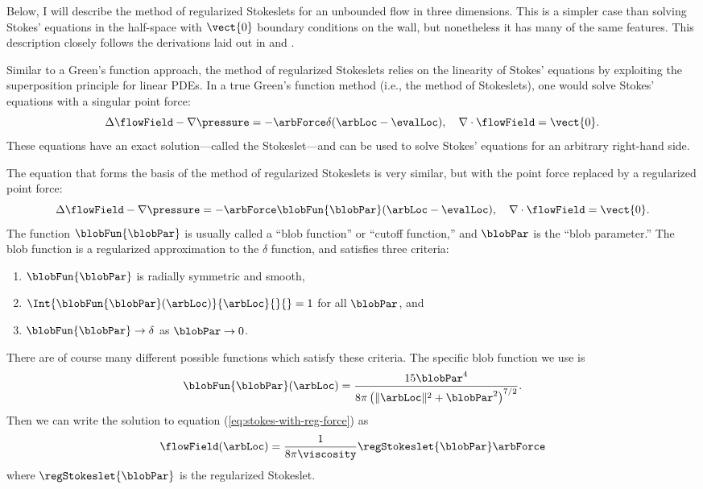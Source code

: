 Below, I will describe the method of regularized Stokeslets for an
unbounded flow in three dimensions. This is a simpler case than
solving Stokes' equations in the half-space with $\vect{0}$
boundary conditions on the wall, but nonetheless it has many of the
same features. This description closely follows the derivations laid
out in \cite{Cortez2001} and \cite{Cortez2005}. %

Similar to a Green's function approach, the method of regularized
Stokeslets relies on the linearity of Stokes' equations by exploiting
the superposition principle for linear PDEs. In a true Green's
function method (i.e., the method of Stokeslets), one would solve
Stokes' equations with a singular point force:
\begin{equation}
  \label{eq:stokes-with-pt-force}
  \Delta \flowField - \nabla \pressure = -\arbForce \delta(\arbLoc
  - \evalLoc), \quad \nabla \cdot \flowField = \vect{0}.
\end{equation}
These equations have an exact solution---called the Stokeslet---and
can be used to solve Stokes' equations for an arbitrary right-hand
side.

The equation that forms the basis of the method of regularized
Stokeslets is very similar, but with the point force replaced by a
regularized point force:
\begin{equation}
  \label{eq:stokes-with-reg-force}
  \Delta \flowField - \nabla \pressure = -\arbForce
  \blobFun{\blobPar}(\arbLoc - \evalLoc), \quad \nabla \cdot
  \flowField = \vect{0}.
\end{equation}
The function $\blobFun{\blobPar}$ is usually called a ``blob
function'' or ``cutoff function,'' and $\blobPar$ is the ``blob
parameter.'' The blob function is a regularized approximation to the
$\delta$ function, and satisfies three criteria:
\begin{enumerate}
\item $\blobFun{\blobPar}$ is radially symmetric and smooth, 
\item $\Int{\blobFun{\blobPar}(\arbLoc)}{\arbLoc}{}{} = 1$ for all
  $\blobPar$, and
\item $\blobFun{\blobPar} \rightarrow \delta$ as $\blobPar \rightarrow
  0$.
\end{enumerate}
There are of course many different possible functions which satisfy
these criteria. The specific blob function we use is
\begin{equation}
  \label{eq:blob-function}
  \blobFun{\blobPar}(\arbLoc) = \frac{15 \blobPar^4}{8 \pi
    \left(\|\arbLoc\|^2 + \blobPar^2 \right)^{7/2}}.
\end{equation}
Then we can write the solution to equation
(\ref{eq:stokes-with-reg-force}) as
\begin{equation}
  \label{eq:solution-to-reg-force}
  \flowField(\arbLoc) = \frac{1}{8\pi \viscosity}
  \regStokeslet{\blobPar} \arbForce
\end{equation}
where $\regStokeslet{\blobPar}$ is the regularized Stokeslet.

